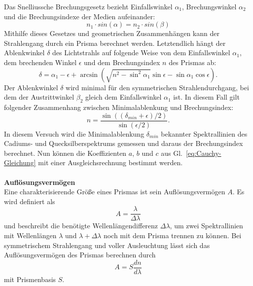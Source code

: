 \documentclass[12pt,a4paper]{article}
\begin{document}
 Das Snelliussche Brechungsgesetz bezieht Einfallswinkel $\alpha_1$, Brechungswinkel $\alpha_2$ und die Brechungsindexe der Medien aufeinander:
\begin{equation}
n_1 \cdot sin(\alpha) = n_2 \cdot sin(\beta)
\end{equation}
Mithilfe dieses Gesetzes und geometrischen Zusammenhängen kann der Strahlengang durch ein Prisma berechnet werden. Letztendlich hängt der Ablenkwinkel $\delta$ des Lichtstrahls auf folgende Weise von dem Einfallswinkel $\alpha_1$, dem brechenden Winkel $\epsilon$ und dem Brechungsindex $n$ des Prismas ab:
\begin{equation}
\delta=\alpha_1-\epsilon+\arcsin{\left(\sqrt{n^2-\sin^2{\alpha_1}}\sin{\epsilon}-\sin{\alpha_1}\cos{\epsilon}\right)}.
\end{equation}
Der Ablenkwinkel $\delta$ wird minimal für den symmetrischen Strahlendurchgang, bei dem der Austrittwinkel $\beta_2$ gleich dem Einfallswinkel $\alpha_1$ ist. In diesem Fall gilt folgender Zusammenhang zwischen Minimalablenkung und Brechungsindex:
\begin{equation}\label{eq:n_aus_delmin}
n=\frac{\sin((\delta_{min}+\epsilon)/2)}{\sin(\epsilon/2)}.
\end{equation}
In diesem Versuch wird die Minimalablenkung $\delta_{min}$ bekannter Spektrallinien des Cadiums- und Quecksilberspektrums gemessen und daraus der Brechungsindex berechnet. Nun können die Koeffizienten $a$, $b$ und $c$ aus  Gl.~\eqref{eq:Cauchy-Gleichung} mit einer Ausgleichsrechnung bestimmt werden.\\\\
\textbf{Auflösungsvermögen}\\
Eine charakterisierende Größe eines Prismas ist sein Auflösungsvermögen $A$. Es wird definiert als 
\begin{equation}
A=\frac{\lambda}{\Delta\lambda}
\end{equation}
und beschreibt die benötigte Wellenlängendifferenz $\Delta\lambda$, um zwei Spektrallinien mit Wellenlängen $\lambda$ und $\lambda+\Delta\lambda$ noch mit dem Prisma trennen zu können. Bei symmetrischem Strahlengang und voller Ausleuchtung lässt sich das Auflösungsvermögen des Prismas berechnen durch
\begin{equation}
A=S\frac{dn}{d\lambda}
\end{equation}
mit Prismenbasis $S$.
\end{document}
